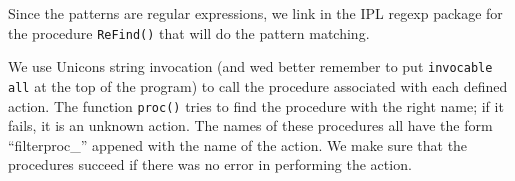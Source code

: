 
Since the patterns are regular expressions, we link in the IPL regexp
package for the procedure \texttt{ReFind()} that will do the pattern
matching.


We use Unicon{\textquotesingle}s string invocation (and
we{\textquotesingle}d better remember to put \texttt{invocable all} at
the top of the program) to call the procedure associated with each
defined action. The function \texttt{proc()} tries to find the
procedure with the right name; if it fails, it is an unknown action.
The names of these procedures all have the form
{\textquotedblleft}filterproc\_{\textquotedblright} appened with the
name of the action. We make sure that the procedures succeed if there
was no error in performing the action.

